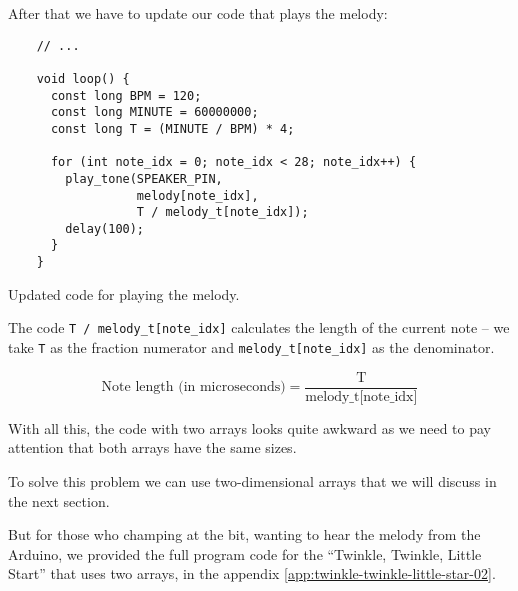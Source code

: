 \documentclass[../sparc.tex]{subfiles}
\begin{document}
After that we have to update our code that plays the melody:

\begin{listing}[H]
  \begin{verbatim}
    // ...

    void loop() {
      const long BPM = 120;
      const long MINUTE = 60000000;
      const long T = (MINUTE / BPM) * 4;

      for (int note_idx = 0; note_idx < 28; note_idx++) {
        play_tone(SPEAKER_PIN,
                  melody[note_idx],
                  T / melody_t[note_idx]);
        delay(100);
      }
    }
  \end{verbatim}
  \label{listing:music-array-example-5}
  \caption{Updated code for playing the melody.}
\end{listing}

The code \texttt{T / melody\_t[note\_idx]} calculates the length of the current
note -- we take \texttt{T} as the fraction numerator and
\texttt{melody\_t[note\_idx]} as the denominator.

\begin{equation}
  \mbox{Note length (in microseconds)} = \frac{\mbox{T}}{\mbox{melody\_t[note\_idx]}}
\end{equation}

With all this, the code with two arrays looks quite awkward as we need to pay
attention that both arrays have the same sizes.

To solve this problem we can use two-dimensional arrays that we will discuss in
the next section.

But for those who champing at the bit, wanting to hear the melody from the
Arduino, we provided the full program code for the ``Twinkle, Twinkle, Little
Start'' that uses two arrays, in the appendix
\ref{app:twinkle-twinkle-little-star-02}.
\end{document}
